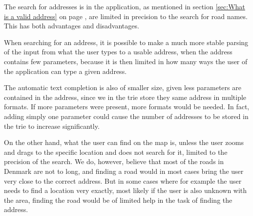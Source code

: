 The search for addresses is in the application, as mentioned in section \ref{sec:What is a valid address} on page \pageref{sec:What is a valid address}, are limited in precision to the search for road names. This has both advantages and disadvantages.

When searching for an address, it is possible to make a much more stable parsing of the input from what the user types to a usable address, when the address contains few parameters, because it is then limited in how many ways the user of the application can type a given address.

The automatic text completion is also of smaller size, given less parameters are contained in the address, since we in the trie store they same address in multiple formats. If more parameters were present, more formats would be needed. In fact, adding simply one parameter could cause the number of addresses to be stored in the trie to increase significantly.

On the other hand, what the user can find on the map is, unless the user zooms and drags to the specific location and does not search for it, limited to the precision of the search. We do, however, believe that most of the roads in Denmark are not to long, and finding a road would in most cases bring the user very close to the correct address. But in some cases where for example the user needs to find a location very exactly, most likely if the user is also unknown with the area, finding the road would be of limited help in the task of finding the address.